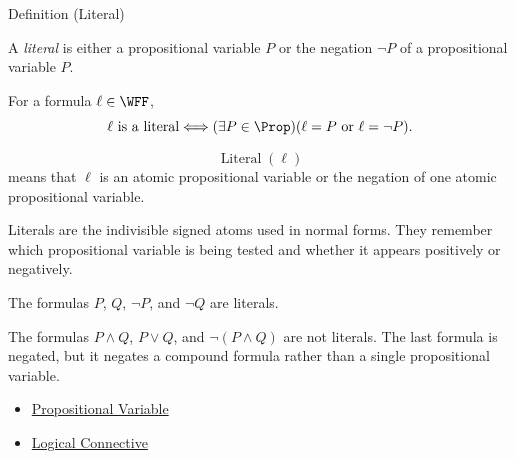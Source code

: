 \begin{definitionbox}{Definition (Literal)}
\begin{definition}[Literal]
\label{def:literal-propositional-logic}
A \emph{literal} is either a propositional variable \(P\) or the negation
\(\neg P\) of a propositional variable \(P\).
\end{definition}
\end{definitionbox}

\begin{remark*}
For a formula \(\ell\in\WFF\),
\[
\ell\text{ is a literal}
\Longleftrightarrow
(\exists P\in\Prop)(\ell=P\text{ or }\ell=\neg P).
\]
\end{remark*}

\begin{remark*}
\[
\operatorname{Literal}(\ell)
\]
means that \(\ell\) is an atomic propositional variable or the negation of one
atomic propositional variable.
\end{remark*}

\begin{remark*}[Interpretation]
Literals are the indivisible signed atoms used in normal forms. They remember
which propositional variable is being tested and whether it appears positively
or negatively.
\end{remark*}

\begin{remark*}[Examples]
The formulas \(P\), \(Q\), \(\neg P\), and \(\neg Q\) are literals.
\end{remark*}

\begin{remark*}
The formulas \(P\land Q\), \(P\lor Q\), and \(\neg(P\land Q)\) are not
literals. The last formula is negated, but it negates a compound formula rather
than a single propositional variable.
\end{remark*}

\begin{dependencies}
\begin{itemize}
  \item \hyperref[def:propositional-variable]{Propositional Variable}
  \item \hyperref[def:logical-connective]{Logical Connective}
\end{itemize}
\end{dependencies}

